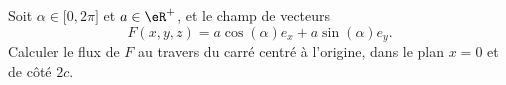 
\begin{exercice}\label{exoOutilsMath-0112}

    Soit $\alpha\in\mathopen[ 0 , 2\pi \mathclose]$ et $a\in\eR^+$, et le champ de vecteurs
    \begin{equation}
        F(x,y,z)=a\cos(\alpha)e_x+a\sin(\alpha)e_y.
    \end{equation}
    Calculer le flux de $F$ au travers du carré centré à l'origine, dans le plan $x=0$ et de côté $2c$.

\end{exercice}
